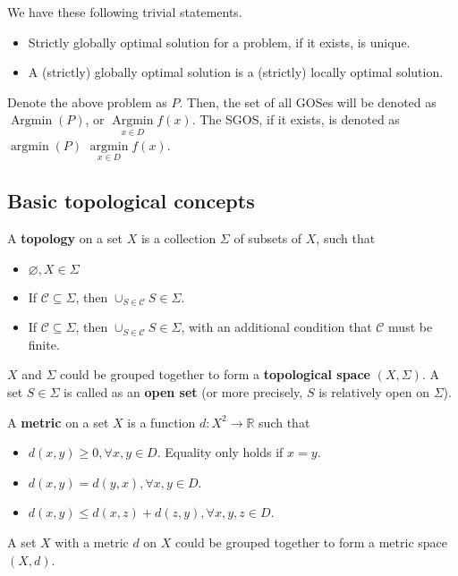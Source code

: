 We have these following trivial statements.
\begin{itemize}
  \item Strictly globally optimal solution for a problem, if it exists, is
    unique.
  \item A (strictly) globally optimal solution is a (strictly) locally
    optimal solution.
\end{itemize}

Denote the above problem as \( P \). Then, the set of all GOSes will be denoted
as \( \operatorname{Argmin}(P) \), or \( \operatorname{Argmin}\limits_{x \in D}
f(x) \). The SGOS, if it exists, is denoted as \( \operatorname{argmin}(P) \) \(
\operatorname{argmin}\limits_{x \in D} f(x) \).

\subsection{Basic topological concepts} %
\label{sub:Basic topological concepts}

\begin{definition}
A \textbf{topology} on a set \( X \) is a collection \( \Sigma \) of subsets of
\( X \), such that

\begin{itemize}
  \item \( \varnothing, X \in \Sigma \)
  \item If \( \mathcal{C} \subseteq \Sigma \), then \( \cup_{S \in
    \mathcal{C}} S \in \Sigma \).
  \item If \( \mathcal{C} \subseteq \Sigma \), then \( \cup_{S \in
    \mathcal{C}} S \in \Sigma \), with an additional condition that \(
    \mathcal{C} \) must be finite.
\end{itemize}

\( X \) and \( \Sigma \) could be grouped together to form a \textbf{topological
space} \( (X, \Sigma) \). A set \( S \in \Sigma \) is called as an \textbf{open
set} (or more precisely, \( S \) is relatively open on \( \Sigma \)).

A \textbf{metric} on a set \( X \) is a function \( d: X^2 \to  \mathbb{R} \)
such that

\begin{itemize}
  \item \( d(x, y) \ge 0, \forall x, y \in D \). Equality only holds if \( x = y
    \).
  \item \( d(x, y) = d(y, x), \forall x, y \in D \).
  \item \( d(x, y) \le d(x, z) + d(z, y), \forall x, y, z \in D \).
\end{itemize}

A set \( X \)  with a metric \( d \) on \( X \) could be grouped together to
form a metric space \( (X, d) \).
\end{definition}

